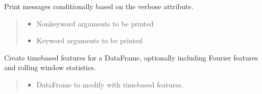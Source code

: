 \documentclass[letterpaper,10pt,english]{sphinxmanual}
\begin{document}
\begin{fulllineitems}
\begin{fulllineitems}
\label{\detokenize{docs/data_preprocessing:data_preprocessing.DataPreprocessor.conditional_print}}
\pysigstartsignatures
{}
\pysigstopsignatures
\sphinxAtStartPar
Print messages conditionally based on the verbose attribute.
\begin{quote}\begin{description}
\begin{itemize}
\item {} 
\sphinxAtStartPar
{} \textendash{} Non\sphinxhyphen{}keyword arguments to be printed

\item {} 
\sphinxAtStartPar
{} \textendash{} Keyword arguments to be printed

\end{itemize}

\end{description}\end{quote}

\end{fulllineitems}


\begin{fulllineitems}
\label{\detokenize{docs/data_preprocessing:data_preprocessing.DataPreprocessor.create_time_features}}
\pysigstartsignatures
{}
\pysigstopsignatures
\sphinxAtStartPar
Create time\sphinxhyphen{}based features for a DataFrame, optionally including Fourier features and rolling window statistics.
\begin{quote}\begin{description}
\begin{itemize}
\item {} 
\sphinxAtStartPar
{} \textendash{} DataFrame to modify with time\sphinxhyphen{}based features.


\end{itemize}
\end{description}
\end{quote}
\end{fulllineitems}
\end{fulllineitems}
\end{document}
